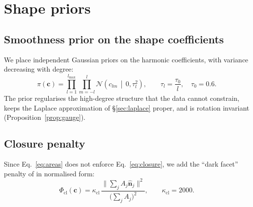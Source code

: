 \documentclass[11pt,a4paper]{article}
\theoremstyle{remark}
\newcommand{\vect}[1]{\bm{#1}}
\newcommand{\uv}[1]{\hat{\bm{#1}}}
\begin{document}
\section{Shape priors}
\label{sec:shapepriors}

\subsection{Smoothness prior on the shape coefficients}
We place independent Gaussian priors on the harmonic coefficients, with variance decreasing with
degree:
\begin{equation}
  \pi(\vect c)=\prod_{l=1}^{l_{\max}}\prod_{m=-l}^{l}\mathcal N\!\left(c_{lm}\,\middle|\,0,\tau_l^2\right),\qquad
  \tau_l=\frac{\tau_0}{l},\quad \tau_0=0.6 .
  \label{eq:cprior}
\end{equation}
The prior regularises the high-degree structure that the data cannot constrain, keeps the Laplace
approximation of \S\ref{sec:laplace} proper, and is rotation invariant (Proposition~\ref{prop:gauge}).

\subsection{Closure penalty}
Since Eq.~\eqref{eq:areas} does not enforce Eq.~\eqref{eq:closure}, we add the ``dark facet'' penalty
of \citet{kaasalainen2001a} in normalised form:
\begin{equation}
  \Phi_{\mathrm{cl}}(\vect c)=\kappa_{\mathrm{cl}}\,\frac{\bigl\lVert\sum_j A_j\uv n_j\bigr\rVert^2}{\bigl(\sum_jA_j\bigr)^2},
  \qquad \kappa_{\mathrm{cl}}=2000 .
\end{equation}
\end{document}
